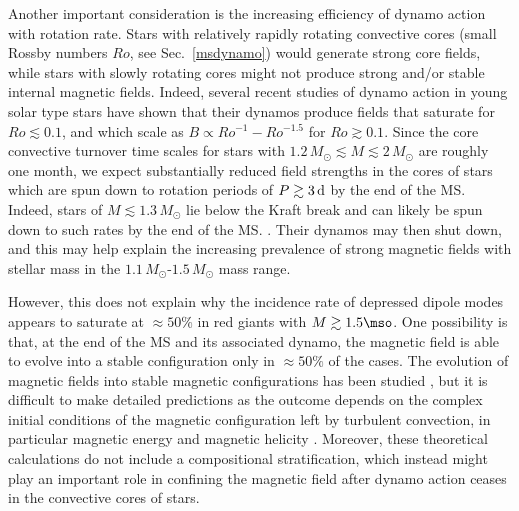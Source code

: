 Another important consideration is the increasing efficiency of dynamo action with rotation rate. Stars with relatively rapidly rotating convective cores (small Rossby numbers $Ro$, see Sec.~\ref{msdynamo}) would generate strong core fields, while stars with slowly rotating cores might not produce strong and/or stable internal magnetic fields. Indeed, several recent studies of dynamo action in young solar type stars \citep{Vidotto_2014,See_2015,Folsom_2016} have shown that their dynamos produce fields that saturate for $Ro \lesssim 0.1$, and which scale as $B \propto Ro^{-1}-Ro^{-1.5}$ for $Ro \gtrsim 0.1$. Since the core convective turnover time scales for stars with $1.2 \, M_\odot \lesssim M \lesssim 2 \, M_\odot$ are roughly one month, we expect substantially reduced field strengths in the cores of stars which are spun down to rotation periods of $P \gtrsim 3 \, {\rm d}$ by the end of the MS. Indeed, stars of $M\lesssim 1.3 \, M_\odot$ lie below the Kraft break and can likely be spun down to such rates by the end of the MS. \citep[see][]{VanSaders_2013}. Their dynamos may then shut down, and this may help explain the increasing prevalence of strong magnetic fields with stellar mass in the $1.1 \, M_\odot$-$1.5 \, M_\odot$ mass range.


However, this does not explain why the incidence rate of depressed dipole modes appears to saturate at $\approx 50\%$ in red giants with $M \gtrsim 1.5 \mso$. One possibility is that, at the end of the MS and its associated dynamo, the magnetic field is able to evolve into a stable configuration only in $\approx 50\%$ of the cases. The evolution of magnetic fields into stable magnetic configurations has been studied \citep{Braithwaite_2006}, but it is difficult to make detailed predictions as the outcome depends on the complex initial conditions of the magnetic configuration left by turbulent convection, in particular magnetic energy and magnetic helicity \citep{Braithwaite_2008}. Moreover, these theoretical calculations do not include a compositional stratification, which instead might play an important role in confining the magnetic field after dynamo action ceases in the convective cores of stars. 